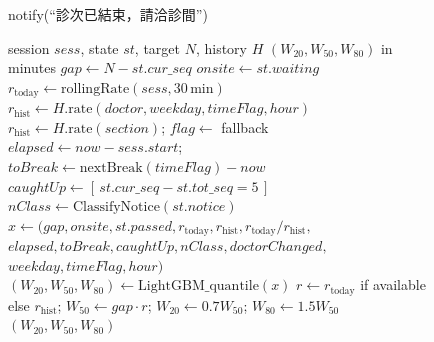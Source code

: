 \documentclass[11pt,twocolumn]{article}
\begin{document}
\begin{figure}[!t]
\begin{minipage}[t]{0.49\textwidth}
\begin{algorithmic}[1]
 \STATE notify(``診次已結束，請洽診間'') \ENDIF
\end{algorithmic}
\end{minipage}\hfill
\begin{minipage}[t]{0.49\textwidth}
\label{alg:pred}
\linespread{1.0}\selectfont\begin{algorithmic}[1]\footnotesize
\REQUIRE session $\mathit{sess}$, state $st$, target $N$, history $H$
\ENSURE $(W_{20},W_{50},W_{80})$ in minutes
\STATE $\mathit{gap} \leftarrow N - st.\mathit{cur\_seq}$ 
\STATE $\mathit{onsite} \leftarrow st.\mathit{waiting}$ 
\STATE $r_{\mathrm{today}} \leftarrow \mathrm{rollingRate}(\mathit{sess}, 30\,\mathrm{min})$ 
\STATE $r_{\mathrm{hist}} \leftarrow H.\mathrm{rate}(\mathit{doctor},\mathit{weekday},\mathit{timeFlag},\mathit{hour})$
 \STATE $r_{\mathrm{hist}} \leftarrow H.\mathrm{rate}(\mathit{section})$; $\mathit{flag}\leftarrow$ fallback \ENDIF
\STATE $\mathit{elapsed} \leftarrow \mathit{now}-\mathit{sess}.\mathit{start}$; $\mathit{toBreak} \leftarrow \mathrm{nextBreak}(\mathit{timeFlag})-\mathit{now}$
\STATE $\mathit{caughtUp} \leftarrow [\,st.\mathit{cur\_seq}-st.\mathit{tot\_seq}=5\,]$ 
\STATE $\mathit{nClass} \leftarrow \mathrm{ClassifyNotice}(st.\mathit{notice})$ 
\STATE $x \leftarrow (\mathit{gap},\mathit{onsite},st.\mathit{passed},r_{\mathrm{today}},r_{\mathrm{hist}},r_{\mathrm{today}}/r_{\mathrm{hist}},$
\STATE \hspace{1.2em}$\mathit{elapsed},\mathit{toBreak},\mathit{caughtUp},\mathit{nClass},\mathit{doctorChanged},$
\STATE \hspace{1.2em}$\mathit{weekday},\mathit{timeFlag},\mathit{hour})$
  \STATE $(W_{20},W_{50},W_{80}) \leftarrow \mathrm{LightGBM\_quantile}(x)$
\ELSE
  \STATE $r \leftarrow r_{\mathrm{today}}$ if available else $r_{\mathrm{hist}}$; $W_{50}\leftarrow \mathit{gap}\cdot r$; $W_{20}\leftarrow 0.7W_{50}$; $W_{80}\leftarrow 1.5W_{50}$ 
\ENDIF
\RETURN $(W_{20},W_{50},W_{80})$
\end{algorithmic}
\end{minipage}
\end{figure}
\end{document}
